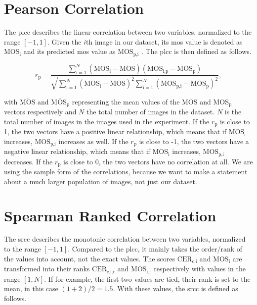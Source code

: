 \section{Pearson Correlation}
\label{sec:pearson}

The \gls{plcc} \cite{pears_spear_2016} describes the linear correlation between two variables, normalized to the range $[-1, 1]$.
Given the $i$th image in our dataset, its \gls{mos} value is denoted as $\text{MOS}_{\text{i}}$ and its predicted \gls{mos} value as $\text{MOS}_{\text{p,i}}$ .
The \gls{plcc} is then defined as follows.

\begin{equation}
    r_{\text{p}} = \frac{\sum_{\text{i}=1}^{N}{(\text{MOS}_{\text{i}}-\overline{\text{MOS}})(\text{MOS}_{\text{i,p}}-\overline{\text{MOS}_{\text{p}}})}}{\sqrt{\sum_{\text{i}=1}^{N}{(\text{MOS}_{\text{i}}-\overline{\text{MOS}})^2}\sum_{\text{i}=1}^{N}{(\text{MOS}_{\text{p,i}}-\overline{\text{MOS}_{\text{p}}})^2}}},
    \label{eq:pearson}
\end{equation}

with $\overline{\text{MOS}}$ and $\overline{\text{MOS}_{\text{p}}}$ representing the mean values of the $\text{MOS}$ and $\text{MOS}_{\text{p}}$ vectors respectively and $N$ the total number of images in the dataset.
$N$ is the total number of images in the images used in the experiment.
If the $r_{\text{p}}$ is close to 1, the two vectors have a positive linear relationship, which means that if $\text{MOS}_{\text{i}}$ increases, $\text{MOS}_{\text{p,i}}$ increases as well.
If the $r_{\text{p}}$ is close to -1, the two vectors have a negative linear relationship, which means that if $\text{MOS}_{\text{i}}$ increases, $\text{MOS}_{\text{p,i}}$ decreases.
If the $r_{\text{p}}$ is close to 0, the two vectors have no correlation at all.
We are using the sample form of the correlations, because we want to make a statement about a much larger population of images, not just our dataset.

\section{Spearman Ranked Correlation}
\label{sec:spearman}

The \gls{srcc} \cite{pears_spear_2016} describes the monotonic correlation between two variables, normalized to the range $[-1, 1]$.
Compared to the \gls{plcc}, it mainly takes the order/rank of the values into account, not the exact values.
The scores $\text{CER}_{\text{c,i}}$ and $\text{MOS}_{\text{i}}$ are transformed into their ranks $\text{CER}_{\text{c,i,r}}$ and $\text{MOS}_{\text{i,r}}$ respectively with values in the range $[1, N]$.
If for example, the first two values are tied, their rank is set to the mean, in this case $(1+2)/2 = 1.5$.
With these values, the \gls{srcc} is defined as follows.

